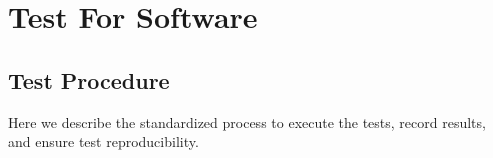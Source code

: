 %
%
%

\chapter{Test For Software}

\section{Test Procedure}

Here we describe the standardized process to execute the tests, record results, and ensure test reproducibility.

